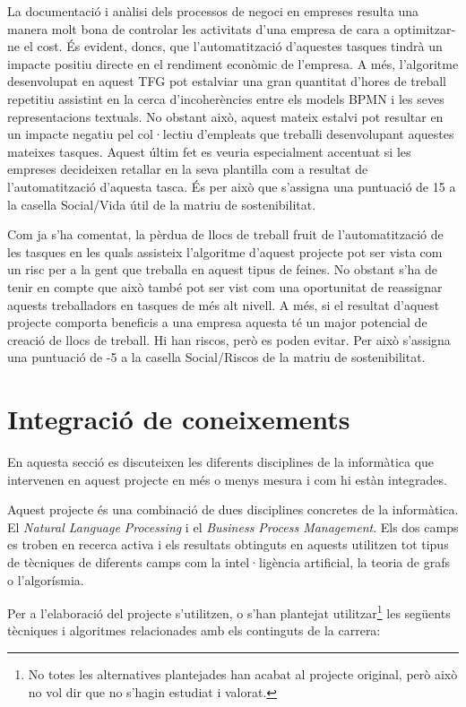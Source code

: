 \documentclass[10pt,a4paper]{article}
\begin{document}
La documentació i anàlisi dels processos de negoci en empreses resulta una manera molt bona de controlar les activitats d'una empresa de cara a optimitzar-ne el cost. És evident, doncs, que l'automatització d'aquestes tasques tindrà un impacte positiu directe en el rendiment econòmic de l'empresa. A més, l'algoritme desenvolupat en aquest TFG pot estalviar una gran quantitat d'hores de treball repetitiu assistint en la cerca d'incoherències entre els models BPMN i les seves representacions textuals. No obstant això, aquest mateix estalvi pot resultar en un impacte negatiu pel col·lectiu d'empleats que treballi desenvolupant aquestes mateixes tasques. Aquest últim fet es veuria especialment accentuat si les empreses decideixen retallar en la seva plantilla com a resultat de l'automatització d'aquesta tasca. És per això que s'assigna una puntuació de 15 a la casella Social/Vida útil de la matriu de sostenibilitat.

Com ja s'ha comentat, la pèrdua de llocs de treball fruit de l'automatització de les tasques en les quals assisteix l'algoritme d'aquest projecte pot ser vista com un risc per a la gent que treballa en aquest tipus de feines. No obstant s'ha de tenir en compte que això també pot ser vist com una oportunitat de reassignar aquests treballadors en tasques de més alt nivell. A més, si el resultat d'aquest projecte comporta beneficis a una empresa aquesta té un major potencial de creació de llocs de treball. Hi han riscos, però es poden evitar. Per això s'assigna una puntuació de -5 a la casella Social/Riscos de la matriu de sostenibilitat.

\section{Integració de coneixements}
\label{integracio}
En aquesta secció es discuteixen les diferents disciplines de la informàtica que intervenen en aquest projecte en més o menys mesura i com hi estàn integrades.

Aquest projecte és una combinació de dues disciplines concretes de la informàtica. El \textit{Natural Language Processing} i el \textit{Business Process Management}. Els dos camps es troben en recerca activa i els resultats obtinguts en aquests utilitzen tot tipus de tècniques de diferents camps com la intel·ligència artificial, la teoria de grafs o l'algorísmia.

Per a l'elaboració del projecte s'utilitzen, o s'han plantejat utilitzar\footnote{No totes les alternatives plantejades han acabat al projecte original, però això no vol dir que no s'hagin estudiat i valorat.} les següents tècniques i algoritmes relacionades amb els continguts de la carrera:
\end{document}
